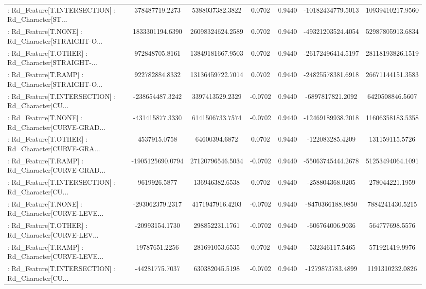 \begin{longtable}{p{4cm}cccccc}
 : Rd\_Feature[T.INTERSECTION] : Rd\_Character[ST... &    378487719.2273 &   5388037382.3822 &  0.0702 &       0.9440 &  -10182434779.5013 &  10939410217.9560 \\
 : Rd\_Feature[T.NONE] : Rd\_Character[STRAIGHT-O... &   1833301194.6390 &  26098324624.2589 &  0.0702 &       0.9440 &  -49321203524.4054 &  52987805913.6834 \\
 : Rd\_Feature[T.OTHER] : Rd\_Character[STRAIGHT-... &    972848705.8161 &  13849181667.9503 &  0.0702 &       0.9440 &  -26172496414.5197 &  28118193826.1519 \\
 : Rd\_Feature[T.RAMP] : Rd\_Character[STRAIGHT-O... &    922782884.8332 &  13136459722.7014 &  0.0702 &       0.9440 &  -24825578381.6918 &  26671144151.3583 \\
 : Rd\_Feature[T.INTERSECTION] : Rd\_Character[CU... &   -238654487.3242 &   3397413529.2329 & -0.0702 &       0.9440 &   -6897817821.2092 &   6420508846.5607 \\
 : Rd\_Feature[T.NONE] : Rd\_Character[CURVE-GRAD... &   -431415877.3330 &   6141506733.7574 & -0.0702 &       0.9440 &  -12469189938.2018 &  11606358183.5358 \\
 : Rd\_Feature[T.OTHER] : Rd\_Character[CURVE-GRA... &      4537915.0758 &     64600394.6872 &  0.0702 &       0.9440 &    -122083285.4209 &    131159115.5726 \\
 : Rd\_Feature[T.RAMP] : Rd\_Character[CURVE-GRAD... &  -1905125690.0794 &  27120796546.5034 & -0.0702 &       0.9440 &  -55063745444.2678 &  51253494064.1091 \\
 : Rd\_Feature[T.INTERSECTION] : Rd\_Character[CU... &      9619926.5877 &    136946382.6538 &  0.0702 &       0.9440 &    -258804368.0205 &    278044221.1959 \\
 : Rd\_Feature[T.NONE] : Rd\_Character[CURVE-LEVE... &   -293062379.2317 &   4171947916.4203 & -0.0702 &       0.9440 &   -8470366188.9850 &   7884241430.5215 \\
 : Rd\_Feature[T.OTHER] : Rd\_Character[CURVE-LEV... &    -20993154.1730 &    298852231.1761 & -0.0702 &       0.9440 &    -606764006.9036 &    564777698.5576 \\
 : Rd\_Feature[T.RAMP] : Rd\_Character[CURVE-LEVE... &     19787651.2256 &    281691053.6535 &  0.0702 &       0.9440 &    -532346117.5465 &    571921419.9976 \\
 : Rd\_Feature[T.INTERSECTION] : Rd\_Character[CU... &    -44281775.7037 &    630382045.5198 & -0.0702 &       0.9440 &   -1279873783.4899 &   1191310232.0826 \\

\end{longtable}
